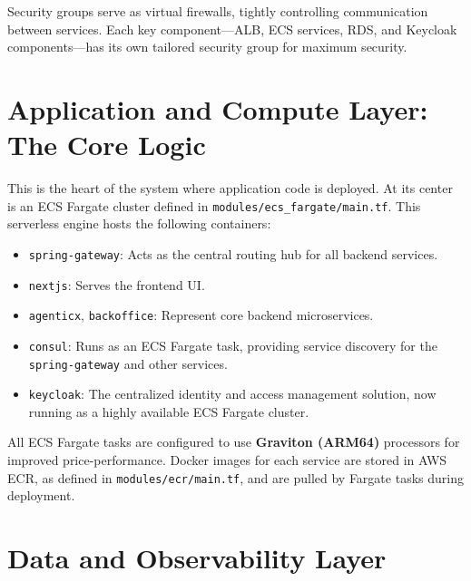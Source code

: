 \documentclass[a4paper,12pt]{article}
\begin{document}
Security groups serve as virtual firewalls, tightly controlling communication between services. Each key component—ALB, ECS services, RDS, and Keycloak components—has its own tailored security group for maximum security.

\section{Application and Compute Layer: The Core Logic}

This is the heart of the system where application code is deployed. At its center is an ECS Fargate cluster defined in \texttt{modules/ecs\_fargate/main.tf}. This serverless engine hosts the following containers:

\begin{itemize}
    \item \texttt{spring-gateway}: Acts as the central routing hub for all backend services.
    \item \texttt{nextjs}: Serves the frontend UI.
    \item \texttt{agenticx}, \texttt{backoffice}: Represent core backend microservices.
    \item \texttt{consul}: Runs as an ECS Fargate task, providing service discovery for the \texttt{spring-gateway} and other services.
    \item \texttt{keycloak}: The centralized identity and access management solution, now running as a highly available ECS Fargate cluster.
\end{itemize}

All ECS Fargate tasks are configured to use \textbf{Graviton (ARM64)} processors for improved price-performance. Docker images for each service are stored in AWS ECR, as defined in \texttt{modules/ecr/main.tf}, and are pulled by Fargate tasks during deployment.

\section{Data and Observability Layer}
\end{document}
